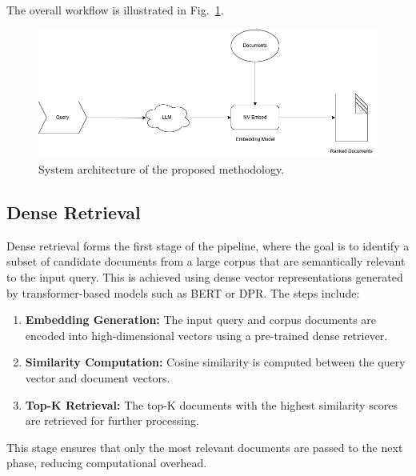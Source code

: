The overall workflow is illustrated in Fig.~\ref{fig:system_architecture}.

\begin{figure}[ht]
    \centering
    \includegraphics[width=\linewidth]{IMAGE/RAG_HyDE_archi.png} %
    \caption{System architecture of the proposed methodology.}
    \label{fig:system_architecture}
\end{figure}

\subsection{Dense Retrieval}
Dense retrieval forms the first stage of the pipeline, where the goal is to identify a subset of candidate documents from a large corpus that are semantically relevant to the input query. This is achieved using dense vector representations generated by transformer-based models such as BERT or DPR. The steps include:
\begin{enumerate}
    \item \textbf{Embedding Generation:} The input query and corpus documents are encoded into high-dimensional vectors using a pre-trained dense retriever.
    \item \textbf{Similarity Computation:} Cosine similarity is computed between the query vector and document vectors.
    \item \textbf{Top-K Retrieval:} The top-K documents with the highest similarity scores are retrieved for further processing.
\end{enumerate}

This stage ensures that only the most relevant documents are passed to the next phase, reducing computational overhead.

